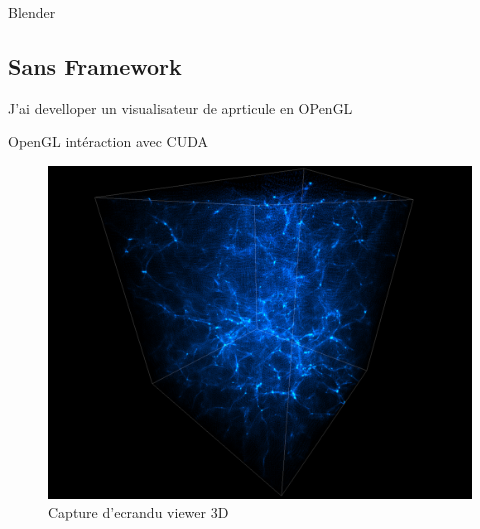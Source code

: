 Blender 



\subsection{Sans Framework}

J'ai develloper un visualisateur de aprticule en OPenGL

OpenGL
intéraction avec CUDA


\begin{figure}[bth]
        \includegraphics[width=.95\linewidth]{img/04/part.png} 
        \caption{Capture d'ecrandu viewer 3D  }
 		\label{fig:ortho}
\end{figure}